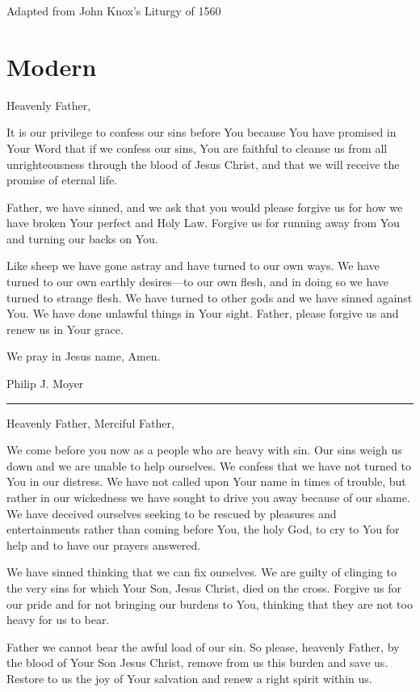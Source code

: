 \documentclass[]{book}
\begin{document}
Adapted from John Knox's Liturgy of 1560

\hypertarget{modern}{%
\section{Modern}\label{modern}}

Heavenly Father,

It is our privilege to confess our sins before You because You have promised in Your Word that if we confess our sins, You are faithful to cleanse us from all unrighteousness through the blood of Jesus Christ, and that we will receive the promise of eternal life.

Father, we have sinned, and we ask that you would please forgive us for how we have broken Your perfect and Holy Law. Forgive us for running away from You and turning our backs on You.

Like sheep we have gone astray and have turned to our own ways. We have turned to our own earthly desires---to our own flesh, and in doing so we have turned to strange flesh. We have turned to other gods and we have sinned against You. We have done unlawful things in Your sight. Father, please forgive us and renew us in Your grace.

We pray in Jesus name, Amen.

Philip J. Moyer

\begin{center}\rule{0.5\linewidth}{\linethickness}\end{center}

Heavenly Father, Merciful Father,

We come before you now as a people who are heavy with sin. Our sins weigh us down and we are unable to help ourselves. We confess that we have not turned to You in our distress. We have not called upon Your name in times of trouble, but rather in our wickedness we have sought to drive you away because of our shame. We have deceived ourselves seeking to be rescued by pleasures and entertainments rather than coming before You, the holy God, to cry to You for help and to have our prayers answered.

We have sinned thinking that we can fix ourselves. We are guilty of clinging to the very sins for which Your Son, Jesus Christ, died on the cross. Forgive us for our pride and for not bringing our burdens to You, thinking that they are not too heavy for us to bear.

Father we cannot bear the awful load of our sin. So please, heavenly Father, by the blood of Your Son Jesus Christ, remove from us this burden and save us. Restore to us the joy of Your salvation and renew a right spirit within us.
\end{document}
